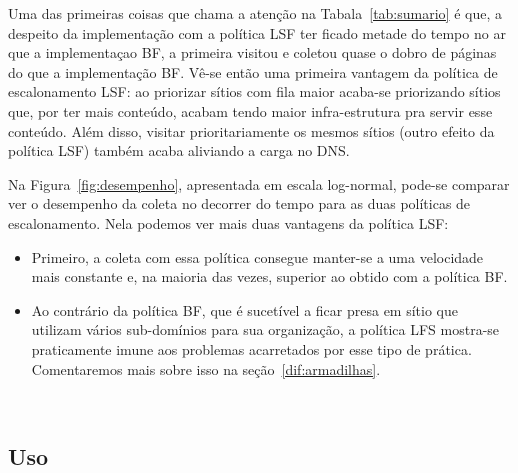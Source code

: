 \documentclass[10pt,twocolumn]{article}
\begin{document}
Uma das primeiras coisas que chama a atenção na Tabala~\ref{tab:sumario}
é que, a despeito da implementação com a política LSF ter ficado metade
do tempo no ar que a implementaçao BF, a primeira visitou e coletou
quase o dobro de páginas do que a implementação BF. Vê-se então
uma primeira vantagem da política de escalonamento LSF: ao priorizar
sítios com fila maior acaba-se priorizando sítios que, por
ter mais conteúdo, acabam tendo maior infra-estrutura
pra servir esse conteúdo. Além disso, visitar prioritariamente os mesmos
sítios (outro efeito da política LSF) também acaba aliviando a carga no DNS.

Na Figura~\ref{fig:desempenho}, apresentada em escala log-normal,
pode-se comparar ver o desempenho da
coleta no decorrer do tempo para as duas políticas de escalonamento.
Nela podemos ver mais duas vantagens da política LSF:
\begin{itemize}
\item Primeiro, a coleta com essa política consegue manter-se a uma
velocidade mais constante e, na maioria das vezes, superior ao obtido
com a política BF.
\item Ao contrário da política BF, que é sucetível a ficar presa em
sítio que utilizam vários sub-domínios para sua organização, a política
LFS mostra-se praticamente imune aos problemas acarretados por esse tipo
de prática. Comentaremos mais sobre isso na seção~\ref{dif:armadilhas}.
\end{itemize}

\begin{figure*}
  \centering
  \mbox{
 }
 \mbox{
  }
  \caption{Desempenho do indexador}
  \label{fig:desempenho}
\end{figure*}

%

\subsection{Uso}
\end{document}

